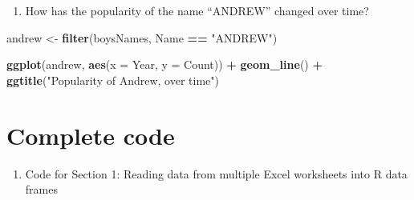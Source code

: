 \documentclass[]{book}
\newenvironment{Shaded}{\begin{snugshade}}{\end{snugshade}}
\newcommand{\KeywordTok}[1]{\textcolor[rgb]{0.13,0.29,0.53}{\textbf{#1}}}
\newcommand{\DataTypeTok}[1]{\textcolor[rgb]{0.13,0.29,0.53}{#1}}
\newcommand{\DecValTok}[1]{\textcolor[rgb]{0.00,0.00,0.81}{#1}}
\newcommand{\StringTok}[1]{\textcolor[rgb]{0.31,0.60,0.02}{#1}}
\newcommand{\OtherTok}[1]{\textcolor[rgb]{0.56,0.35,0.01}{#1}}
\newcommand{\ControlFlowTok}[1]{\textcolor[rgb]{0.13,0.29,0.53}{\textbf{#1}}}
\newcommand{\OperatorTok}[1]{\textcolor[rgb]{0.81,0.36,0.00}{\textbf{#1}}}
\newcommand{\NormalTok}[1]{#1}
\providecommand{\tightlist}{%
  \setlength{\itemsep}{0pt}\setlength{\parskip}{0pt}}
\begin{document}
\begin{enumerate}
\def\labelenumi{\arabic{enumi}.}
\setcounter{enumi}{3}
\tightlist
\item
  How has the popularity of the name ``ANDREW'' changed over time?
\end{enumerate}

\begin{Shaded}
\begin{Highlighting}[]
\NormalTok{andrew <-}\StringTok{ }\KeywordTok{filter}\NormalTok{(boysNames, Name }\OperatorTok{==}\StringTok{ "ANDREW"}\NormalTok{)}

\KeywordTok{ggplot}\NormalTok{(andrew, }\KeywordTok{aes}\NormalTok{(}\DataTypeTok{x =}\NormalTok{ Year, }\DataTypeTok{y =}\NormalTok{ Count)) }\OperatorTok{+}
\StringTok{    }\KeywordTok{geom_line}\NormalTok{() }\OperatorTok{+}
\StringTok{    }\KeywordTok{ggtitle}\NormalTok{(}\StringTok{"Popularity of Andrew, over time"}\NormalTok{)}
\end{Highlighting}
\end{Shaded}

\section{Complete code}\label{complete-code}

\begin{enumerate}
\def\labelenumi{\arabic{enumi}.}
\tightlist
\item
  Code for Section 1: Reading data from multiple Excel worksheets into R
  data frames
\end{enumerate}

\begin{Shaded}
\end{Shaded}
\end{document}
